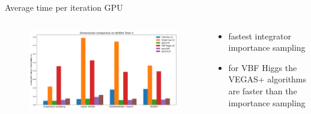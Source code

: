 \documentclass[t,handout,professionalfont,serif]{beamer}
\begin{document}
\begin{frame}{Average time per iteration GPU}
	
		\tiny
	\begin{columns}
		\begin{column}{0.7 \textwidth}
			\begin{figure}
				\includegraphics[width= \columnwidth]{gpu.png}
			\end{figure}
			
		\end{column}
			\hspace{-0.5cm}
		\begin{column}{0.3 \textwidth}
			\vspace{0.7cm}
			
			\begin{itemize}
				
				\item fastest integrator importance sampling
				\item for VBF Higgs the VEGAS+ algorithms are faster than the importance sampling
			\end{itemize}
		\end{column}
	\end{columns}


\end{frame}

	
\end{document}
